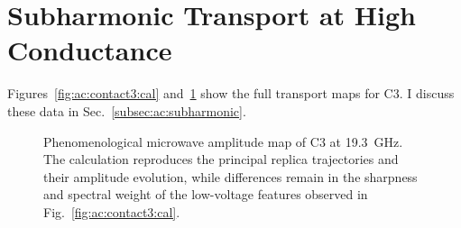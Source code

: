     \section{Subharmonic Transport at High Conductance}
    \label{appendix:ac:subharmonic}

        Figures~\ref{fig:ac:contact3:cal} and~\ref{fig:ac:contact3:sim} show the full transport maps for C3. I discuss these data in Sec.~\ref{subsec:ac:subharmonic}.

        \begin{figure}[p]
            \centering
            \caption{
                Calibrated microwave amplitude map of C3 under antenna irradiation at \qty{19.3}{\giga\hertz}. The \textit{I--V}, \textit{dI--dV}, and \textit{dV--dI} columns show the measured response as waterfall cuts, surfaces, and heat maps. Increasing the drive produces replicas of the quasiparticle branch and the static subgap structure, together with additional closely spaced features originating near zero voltage.
                }
            \label{fig:ac:contact3:cal}

            \vspace{1em}

            \caption{
                Phenomenological microwave amplitude map of C3 at \qty{19.3}{\giga\hertz}. The calculation reproduces the principal replica trajectories and their amplitude evolution, while differences remain in the sharpness and spectral weight of the low-voltage features observed in Fig.~\ref{fig:ac:contact3:cal}.
                }
            \label{fig:ac:contact3:sim}
        \end{figure}
